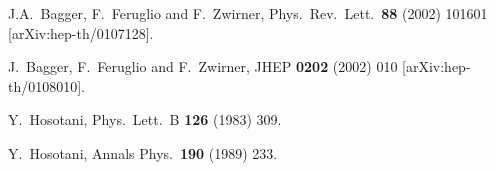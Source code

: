 \documentclass[a4paper,12pt]{article}
\begin{document}
\begin{thebibliography}{99}
J.A.~Bagger, F.~Feruglio and F.~Zwirner,
Phys.\ Rev.\ Lett.\  {\bf 88} (2002) 101601
[arXiv:hep-th/0107128].

J.~Bagger, F.~Feruglio and F.~Zwirner,
JHEP {\bf 0202} (2002) 010
[arXiv:hep-th/0108010].

Y.~Hosotani,
Phys.\ Lett.\ B {\bf 126} (1983) 309.

Y.~Hosotani,
Annals Phys.\  {\bf 190} (1989) 233.

\end{thebibliography}
\end{document}
